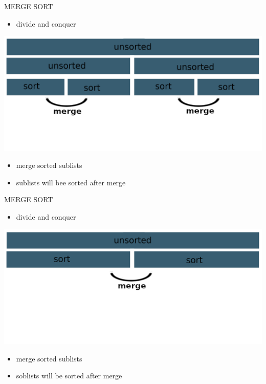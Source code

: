 \documentclass[aspectratio=169]{beamer}
\begin{document}
\begin{frame}{MERGE SORT}
\begin{itemize}
\item divide and conquer
\end{itemize}
\begin{center}
\includegraphics[scale=0.70]{graphics/marge_sort3.png}
\end{center}
\begin{itemize}
\item merge sorted sublists
\item sublists will bee sorted after merge
\end{itemize}
\end{frame}

\begin{frame}{MERGE SORT}
\begin{itemize}
\item divide and conquer
\end{itemize}
\begin{center}
\includegraphics[scale=0.70]{graphics/marge_sort4.png}
\end{center}
\begin{itemize}
\item merge sorted sublists
\item soblists will be sorted after merge
\end{itemize}
\end{frame}
\end{document}
